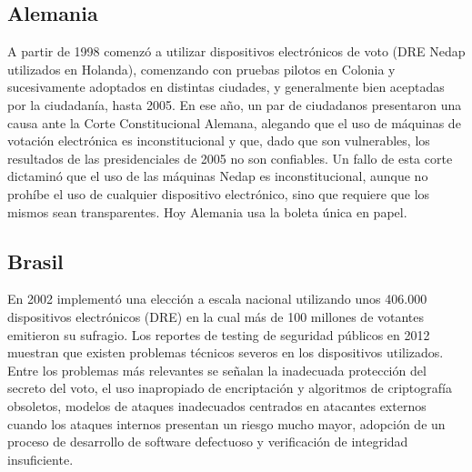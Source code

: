 \subsection{Alemania}
A partir de 1998 comenzó a utilizar dispositivos electrónicos de voto (DRE Nedap utilizados en Holanda), comenzando con pruebas pilotos en Colonia y sucesivamente adoptados en distintas ciudades, y generalmente bien aceptadas por la ciudadanía, hasta 2005. En ese año, un par de ciudadanos presentaron una causa ante la Corte Constitucional Alemana, alegando que el uso de máquinas de votación electrónica es inconstitucional y que, dado que son vulnerables, los resultados de las presidenciales de 2005 no son confiables. Un fallo de esta corte dictaminó que el uso de las máquinas Nedap es inconstitucional, aunque no prohíbe el uso de cualquier dispositivo electrónico, sino que requiere que los mismos sean transparentes. Hoy Alemania usa la boleta única en papel.\cite{volkamer2010electronic}

\subsection{Brasil}
En 2002 implementó una elección a escala nacional utilizando unos 406.000 dispositivos electrónicos (DRE) en la cual más de 100 millones de votantes emitieron su sufragio. Los reportes de testing de seguridad públicos en 2012 muestran que existen problemas técnicos severos en los dispositivos utilizados. Entre los problemas más relevantes se señalan la inadecuada protección del secreto del voto, el uso inapropiado de encriptación y algoritmos de criptografía obsoletos, modelos de ataques inadecuados centrados en atacantes externos cuando los ataques internos presentan un riesgo mucho mayor, adopción de un proceso de desarrollo de software defectuoso y verificación de integridad insuficiente.\cite{brunazo2005voto}

